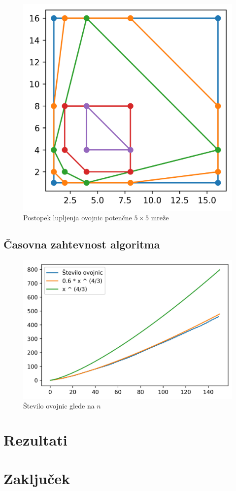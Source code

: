 \documentclass[a4paper]{article}
\begin{document}
\begin{figure}[!h]
	\centering
	\caption{Postopek lupljenja ovojnic potenčne $5 \times 5$ mreže}
	\label{fig:5x5}
	\vspace{2mm}
	\includegraphics[scale=0.7]{5x5_potencna.png}
\end{figure}

\newpage
\subsection{Časovna zahtevnost algoritma}

\begin{figure}[!h]
	\centering
	\caption{Število ovojnic glede na $n$}
	\label{fig:st_ovojnic}
	\vspace{2mm}
	\includegraphics[scale=0.7]{st_ovojnic.jpg}
\end{figure}

\newpage
\section{Rezultati}

\section{Zaključek}
\end{document}

